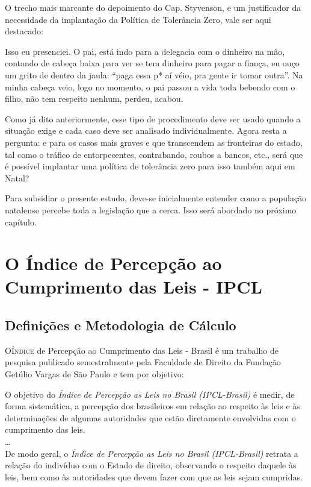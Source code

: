 \documentclass[
	12pt,				%
	openright,			%
	twoside,			%
	a4paper,			%
	chapter=TITLE,		%
	section=TITLE,		%
	subsection=TITLE,	%
	subsubsection=TITLE,%
	spanish,            %
	english,			%
	brazil				%
	]{abntex2}
\begin{document}
\par
O trecho mais marcante do depoimento do Cap. Styvenson, e um justificador da necessidade da implantação da Política de Tolerância Zero, vale ser aqui destacado:
\begin{citacao}
	Isso eu presenciei. O pai, está indo para a delegacia com o dinheiro na mão, contando de cabeça baixa para ver se tem dinheiro para pagar a fiança, eu ouço um grito de dentro da jaula: “paga essa p* aí véio, pra gente ir tomar outra”. Na minha cabeça veio, logo no momento,  o pai passou a vida toda bebendo com o filho, não tem respeito nenhum, perdeu, acabou.
\end{citacao}
\par
Como já dito anteriormente, esse tipo de procedimento deve ser usado quando a situação exige e cada caso deve ser analisado individualmente. Agora resta a pergunta: e para os casos mais graves e que transcendem as fronteiras do estado, tal como o tráfico de entorpecentes, contrabando, roubos a bancos, etc.,
será que é possível implantar uma política de tolerância zero para isso também aqui em Natal?
\par
Para subsidiar o presente estudo, deve-se inicialmente entender como a população natalense percebe toda a legislação que a cerca. Isso será abordado no próximo capítulo.

\chapter{O Índice de Percepção ao Cumprimento das Leis - IPCL}

\section{Definições e Metodologia de Cálculo}
\lettrine[lines=2, lhang=0.33, loversize=0.25]{O} {Índice} de Percepção ao Cumprimento das Leis - Brasil é um trabalho de pesquisa publicado semestralmente pela Faculdade de Direito da Fundação Getúlio Vargas de São Paulo  e tem por objetivo:
\begin{citacao}
	O objetivo do \textit{Índice de Percepção as Leis no Brasil (IPCL-Brasil)} é medir, de forma sistemática, a percepção dos brasileiros em relação ao respeito às	leis e às determinações de algumas autoridades que estão diretamente envolvidas	com o cumprimento das leis.\\
	\ldots\\
	De modo geral, o \textit{Índice de Percepção as Leis no Brasil (IPCL-Brasil)} retrata a relação do indivíduo com o Estado de direito, observando o respeito daquele às leis, bem como às autoridades que devem fazer com que as leis sejam cumpridas.\cite[p. ~2-3]{FGV}
\end{citacao}
\end{document}
